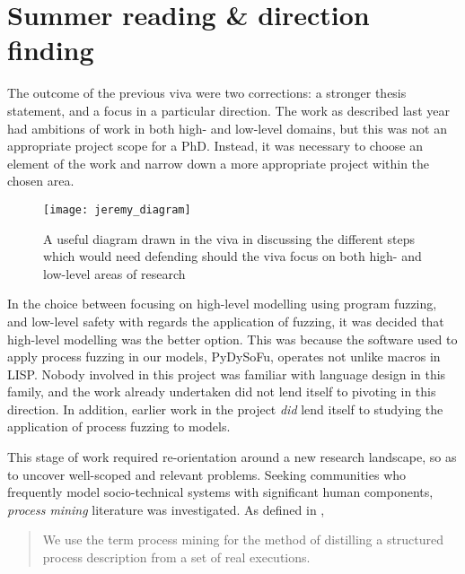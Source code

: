 \documentclass[11pt]{article}
\newcommand{\ampersand}{\&}
\begin{document}
\section{Summer reading \ampersand{} direction finding}
\label{sec:org72f95f6}

The outcome of the previous viva were two corrections: a stronger thesis
statement, and a focus in a particular direction. The work as described last
year had ambitions of work in both high- and low-level domains, but this was not
an appropriate project scope for a PhD. Instead, it was necessary to choose an
element of the work and narrow down a more appropriate project within the chosen
area.

\begin{figure}[h]
\texttt{[image: jeremy\_diagram]}
\centering
\caption{A useful diagram drawn in the viva in discussing the different steps
which would need defending should the viva focus on both high- and low-level areas
of research}
\label{fig:jeremy_diagram}
\end{figure}

In the choice between focusing on high-level modelling using program fuzzing,
and low-level safety with regards the application of fuzzing, it was decided
that high-level modelling was the better option. This was because the software
used to apply process fuzzing in our models, PyDySoFu\cite{pdsf_repo}, operates
not unlike macros in LISP. Nobody involved in this project was familiar with
language design in this family, and the work already undertaken did not lend
itself to pivoting in this direction. In addition, earlier work in the project
\emph{did} lend itself to studying the application of process fuzzing to models.

This stage of work required re-orientation around a new research landscape, so
as to uncover well-scoped and relevant problems. Seeking communities who
frequently model socio-technical systems with significant human components,
\emph{process mining} literature was investigated. As defined in
\cite{process_mining_research_agenda},

\begin{quote}
We use the term process mining for the method of distilling a structured process
description from a set of real executions.
\end{quote}
\end{document}
